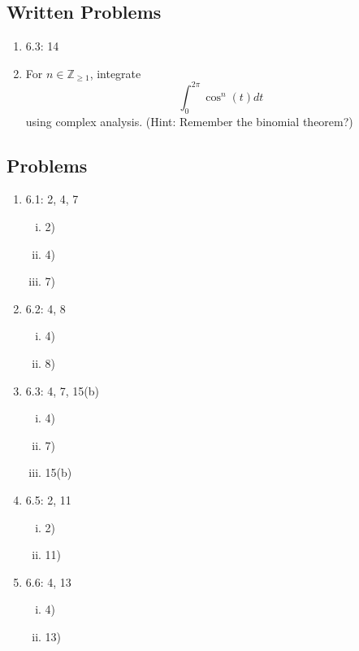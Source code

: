 \documentclass[11pt]{article}
\newcommand{\ZZ}{\mathbb{Z}}
\begin{document}

\subsection*{Written Problems}
\begin{enumerate}
\item 6.3: 14
\item For $n\in \ZZ_{\geq 1}$, integrate 
$$\int_{0}^{2\pi} \cos^n(t) dt$$
using complex analysis.  (Hint: Remember the binomial theorem?)
\end{enumerate}

\subsection*{Problems}

\begin{enumerate}
\item 6.1: 2, 4, 7
\begin{enumerate}[(i)]
\item 2)\\
\item 4)\\
\item 7)\\
\end{enumerate}

\item 6.2: 4, 8 
\begin{enumerate}[(i)]
\item 4)\\
\item 8)\\
\end{enumerate}

\item 6.3: 4, 7, 15(b)
\begin{enumerate}[(i)]
\item 4)\\
\item 7)\\
\item 15(b)\\
\end{enumerate}

\item 6.5: 2, 11
\begin{enumerate}[(i)]
\item 2)\\
\item 11)\\
\end{enumerate}

\item 6.6: 4, 13
\begin{enumerate}[(i)]
\item 4)\\
\item 13)\\
\end{enumerate}
\end{enumerate}
\end{document}
